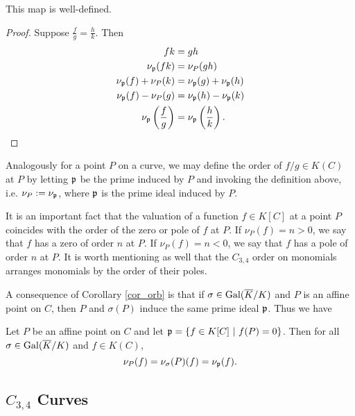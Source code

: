 \begin{proposition}
  This map is well-defined.
\end{proposition}
\begin{proof}
  Suppose $\frac f g = \frac h k$. Then
  \begin{align*}
    fk &= gh \\
    \nu_{\frak p}(fk) &= \nu_P(gh) \\
    \nu_{\frak p}(f) + \nu_P(k) &= \nu_{\frak p}(g) + \nu_{\frak p}(h) \\
    \nu_{\frak p}(f) - \nu_P(g) &= \nu_{\frak p}(h) - \nu_{\frak p}(k) \\
    \nu_{\frak p}\left(\frac f g\right) &= \nu_{\frak p}\left(\frac h k\right).
  \end{align*}
\end{proof}

Analogously for a point $P$ on a curve,
we may define the order of $f/g \in K(C)$ at $P$
by letting $\frak p$ be the prime induced by $P$ and invoking the definition above,
i.e. $\nu_P := \nu_{\frak p}$, where $\frak p$ is the prime ideal induced by $P$.

It is an important fact that the valuation of a function $f \in K[C]$ at a point $P$
coincides with the order of the zero or pole of $f$ at $P$.
If $\nu_P(f) = n > 0$, we say that $f$ has a zero of order $n$ at $P$.
If $\nu_P(f) = n < 0$, we say that $f$ has a pole of order $n$ at $P$.
It is worth mentioning as well that the $C_{3,4}$ order on monomials arranges monomials by the order of their poles.

A consequence of Corollary \ref{cor_orb} is that if $\sigma \in \operatorname{Gal}(\overline K/K)$ and $P$ is an affine point on $C$,
then $P$ and $\sigma(P)$ induce the same prime ideal $\frak p$. Thus we have
\begin{proposition}
  Let $P$ be an affine point on $C$ and let $\frak p = \{ f \in K[C] ~|~ f(P) = 0 \}$.
  Then for all $\sigma \in \operatorname{Gal}(\overline K/K)$ and $f \in K(C)$,
  \[ \nu_P(f) = \nu_\sigma(P)(f) = \nu_{\frak p}(f). \]
\end{proposition}





\subsection{$C_{3,4}$ Curves}

